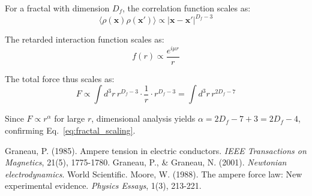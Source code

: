 \documentclass[10pt, a4paper]{article}
\begin{document}
	For a fractal with dimension $D_f$, the correlation function scales as:
	\begin{equation}
		\langle \rho(\mathbf{x}) \rho(\mathbf{x}')\rangle \propto |\mathbf{x}-\mathbf{x}'|^{D_f - 3}
	\end{equation}
	
	The retarded interaction function scales as:
	\begin{equation}
		f(r) \propto \frac{e^{i\mu r}}{r}
	\end{equation}
	
	The total force thus scales as:
	\begin{equation}
		F \propto \int d^3r \, r^{D_f - 3} \cdot \frac{1}{r} \cdot r^{D_f - 3} = \int d^3r \, r^{2D_f - 7}
	\end{equation}
	
	Since $F \propto r^{\alpha}$ for large $r$, dimensional analysis yields $\alpha = 2D_f - 7 + 3 = 2D_f - 4$, confirming Eq.~\ref{eq:fractal_scaling}.
	
	\begin{thebibliography}{9}
		 Graneau, P. (1985). Ampere tension in electric conductors. \textit{IEEE Transactions on Magnetics}, 21(5), 1775-1780.
		 Graneau, P., \& Graneau, N. (2001). \textit{Newtonian electrodynamics}. World Scientific.
		 Moore, W. (1988). The ampere force law: New experimental evidence. \textit{Physics Essays}, 1(3), 213-221.
	\end{thebibliography}
	
\end{document}
